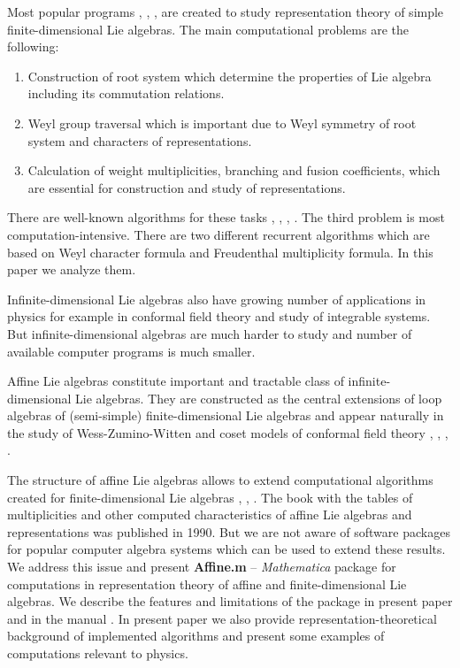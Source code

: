 \documentclass[preprint,12pt]{elsarticle}
\begin{document}
Most popular programs \cite{simplie}, \cite{vanleeuwen1994lsp}, \cite{fischbacher2002ilp}, \cite{coxweyl} are created to study representation theory of simple finite-dimensional Lie algebras. The main computational problems are the following:
\begin{enumerate}
\item Construction of root system which determine the properties of Lie algebra including its commutation relations.
\item Weyl group traversal which is important due to Weyl symmetry of root system and characters of representations.
\item Calculation of weight multiplicities, branching and fusion coefficients, which are essential for construction and study of representations.
\end{enumerate}
There are well-known algorithms for these tasks \cite{moody1982fast}, \cite{stembridge2001computational}, \cite{belinfante1989survey}, \cite{casselman1994machine}.
The third problem is most computation-intensive. There are two different recurrent algorithms which are based on Weyl character formula and Freudenthal multiplicity formula. In this paper we analyze them.

Infinite-dimensional Lie algebras also have growing number of applications in physics for example in conformal field theory and study of  integrable systems. But infinite-dimensional algebras are much harder to study and number of available computer programs is much smaller.

Affine Lie algebras \cite{kac1990idl} constitute important and tractable class of infinite-dimensional Lie algebras. They are constructed as the central extensions of loop algebras of (semi-simple) finite-dimensional Lie algebras and appear naturally in the study of Wess-Zumino-Witten and coset models of conformal field theory \cite{Walton:1999xc}, \cite{difrancesco1997cft}, \cite{Goddard198588}, \cite{Dunbar:1992gh}.

The structure of affine Lie algebras allows to extend computational algorithms created for finite-dimensional Lie algebras  \cite{Fuchs:1996dd}, \cite{gannon2001algorithms}, \cite{kass1990ala}. The book \cite{kass1990ala} with the tables of multiplicities and other computed characteristics of affine Lie algebras and representations was published in 1990. But we are not aware of software packages for popular computer algebra systems which can be used to extend these results.
We address this issue and present {\bf Affine.m} -- {\it Mathematica} package for computations in representation theory of affine and finite-dimensional Lie algebras.  We describe the features and limitations of the package in present paper and in the manual \cite{affinemanual}. In present paper we also provide representation-theoretical background of implemented algorithms and present some examples of computations relevant to physics.
\end{document}
